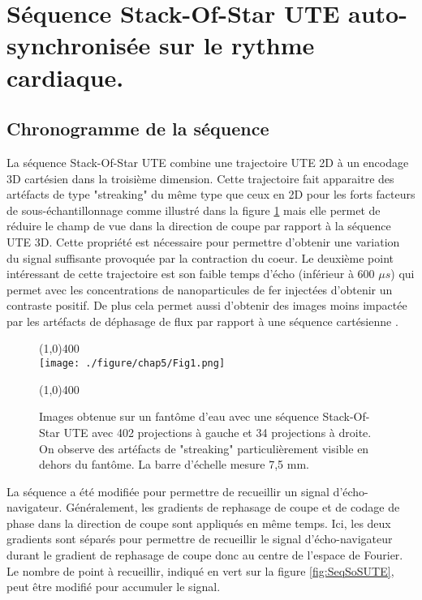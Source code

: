 \section{Séquence Stack-Of-Star UTE auto-synchronisée sur le rythme cardiaque.}

\subsection{Chronogramme de la séquence}

La séquence Stack-Of-Star UTE combine une trajectoire UTE 2D à un encodage 3D cartésien dans la troisième dimension. Cette trajectoire fait apparaitre des artéfacts de type "streaking" du même type que ceux en 2D pour les forts facteurs de sous-échantillonnage comme illustré dans la figure \ref{fig:SoSUTE} mais elle permet de réduire le champ de vue dans la direction de coupe par rapport à la séquence UTE 3D. Cette propriété est nécessaire pour permettre d'obtenir une variation du signal suffisante provoquée par la contraction du coeur. Le deuxième point intéressant de cette trajectoire est son faible temps d'écho (inférieur à 600 $\mu s$) qui permet avec les concentrations de nanoparticules de fer injectées d'obtenir un contraste positif. De plus cela permet aussi d'obtenir des images moins impactée par les artéfacts de déphasage de flux par rapport à une séquence cartésienne \cite{Hoerr:2013gf}.

\begin{figure}[H]
\centering
\line(1,0){400} \\
\texttt{[image: ./figure/chap5/Fig1.png]}
\caption[Effet du sous-échantillonnage SoSUTE]{\label{fig:SoSUTE} Images obtenue sur un fantôme d'eau avec une séquence Stack-Of-Star UTE avec 402 projections à gauche et 34 projections à droite. On observe des artéfacts de "streaking" particulièrement visible en dehors du fantôme. La barre d'échelle mesure 7,5 mm.}
\line(1,0){400} \\ 
\end{figure}

La séquence a été modifiée pour permettre de recueillir un signal d'écho-navigateur. Généralement, les gradients de rephasage de coupe et de codage de phase dans la direction de coupe sont appliqués en même temps. Ici, les deux gradients sont séparés pour permettre de recueillir le signal d'écho-navigateur durant le gradient de rephasage de coupe donc au centre de l'espace de Fourier. Le nombre de point à recueillir, indiqué en vert sur la figure \ref{fig:SeqSoSUTE}, peut être modifié pour accumuler le signal.

